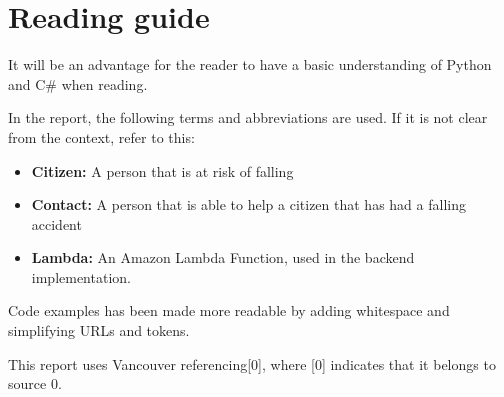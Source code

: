 \newpage
\section*{Reading guide}

It will be an advantage for the reader to have a basic understanding of Python and C\# when reading.

In the report, the following terms and abbreviations are used. If it is not clear from the context, refer to this:
\begin{itemize}
    \item \textbf{Citizen:} A person that is at risk of falling
    \item \textbf{Contact:} A person that is able to help a citizen that has had a falling accident
    \item \textbf{Lambda:} An Amazon Lambda Function, used in the backend implementation.
\end{itemize}

Code examples has been made more readable by adding whitespace and simplifying URLs and tokens.

This report uses Vancouver referencing[0], where [0] indicates that it belongs to source 0.